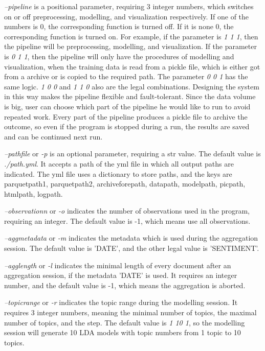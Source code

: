 \documentclass{article} %
\begin{document}
\textit{--pipeline} is a positional parameter, requiring 3 integer numbers, which switches on or off preprocessing, modelling, and visualization respectively. If one of the numbers is 0, the corresponding function is turned off. If it is none 0, the corresponding function is turned on. For example, if the parameter is \textit{1 1 1}, then the pipeline will be preprocessing, modelling, and visualization. If the parameter is \textit{0 1 1}, then the pipeline will only have the procedures of modelling and visualization, when the training data is read from a pickle file, which is either got from a archive or is copied to the required path. The parameter \textit{0 0 1} has the same logic. \textit{1 0 0} and \textit{1 1 0} also are the legal combinations. Designing the system in this way makes the pipeline flexible and fault-tolerant. Since the data volume is big, user can choose which part of the pipeline he would like to run to avoid repeated work. Every part of the pipeline produces a pickle file to archive the outcome, so even if the program is stopped during a run, the results are saved and can be continued next run.

\textit{--path\textunderscore{}file} or \textit{-p} is an optional parameter, requiring a str value. The default value is \textit{./path.yml}. It accepts a path of the yml file in which all output paths are indicated. The yml file uses a dictionary to store paths, and the keys are parquet\textunderscore{}path1,
parquet\textunderscore{}path2,
archive\textunderscore{}fore\textunderscore{}path,
data\textunderscore{}path,
model\textunderscore{}path,
pic\textunderscore{}path,
html\textunderscore{}path,
log\textunderscore{}path.

\textit{--observation\textunderscore{}n} or \textit{-o} indicates the number of observations used in the program, requiring an integer. The default value is -1, which means use all observations.

\textit{--agg\textunderscore{}metadata} or \textit{-m} indicates the metadata which is used during the aggregation session. The default value is 'DATE', and the other legal value is 'SENTIMENT'.

\textit{--agg\textunderscore{}length} or \textit{-l} indicates the minimal length of every document after an aggregation session, if the metadata 'DATE' is used. It requires an integer number, and the default value is -1, which means the aggregation is aborted.

\textit{--topic\textunderscore{}range} or \textit{-r} indicates the topic range during the modelling session. It requires 3 integer numbers, meaning the minimal number of topics, the maximal number of topics, and the step. The default value is \textit{1 10 1}, so the modelling session will generate 10 LDA models with topic numbers from 1 topic to 10 topics.
\end{document}
